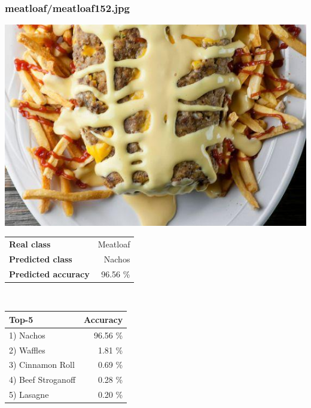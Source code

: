 \subsubsection{meatloaf/meatloaf152.jpg}

\begin{minipage}[t]{0.4\textwidth}
	\vspace{0pt}
	\includegraphics[width=\linewidth]{images/evaluation-images/meatloaf/meatloaf152.jpg}
\end{minipage}
\hfill
\begin{minipage}[t]{0.5\textwidth}
	\vspace{0pt}\raggedright
	\begin{tabularx}{\textwidth}{X r}
		\small \textbf{Real class} & \small Meatloaf\\
		\small \textbf{Predicted class} & \small Nachos\\
		\small \textbf{Predicted accuracy} & \small 96.56 \%
    \end{tabularx}\\
    
    \vspace{6pt}
	\begin{tabularx}{\textwidth}{X r}
        \small \textbf{Top-5} & \small \textbf{Accuracy} \\
        \hline
		\small 1) Nachos & \small 96.56 \%\\\small 2) Waffles & \small 1.81 \%\\\small 3) Cinnamon Roll & \small 0.69 \%\\\small 4) Beef Stroganoff & \small 0.28 \%\\\small 5) Lasagne & \small 0.20 \%
    \end{tabularx}
\end{minipage}
    

